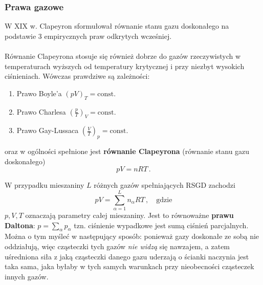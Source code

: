 \documentclass[../main.tex]{subfiles}
\begin{document}
\subsubsection{Prawa gazowe}
W XIX w. Clapeyron sformułował równanie stanu gazu doskonałego na podstawie 3 empirycznych praw
odkrytych wcześniej.\\

\noindent{}\\

Równanie Clapeyrona stosuje się również dobrze do gazów rzeczywistych w temperaturach wyższych od
temperatury krytycznej i przy niezbyt wysokich ciśnieniach. Wówczas prawdziwe są zależności:
\begin{enumerate}
    \item Prawo Boyle'a \((pV)_{T}=\text{const}\).
    \item Prawo Charlesa \(\left(\frac{p}{T}\right)_{V}=\text{const}\).
    \item Prawo Gay-Lussaca \(\left(\frac{V}{T}\right)_{p}=\text{const}\).
\end{enumerate}
oraz w ogólności spełnione jest \textbf{równanie Clapeyrona} (równanie stanu gazu doskonałego)
\begin{equation*}
    pV=nRT\,.
\end{equation*}

W przypadku mieszaniny \(L\) różnych gazów spełniających RSGD zachodzi
\begin{equation*}
    pV=\sum_{\alpha=1}^Ln_\alpha RT\,,\quad\text{gdzie}
\end{equation*}
\(p,V,T\) oznaczają parametry całej mieszaniny. Jest to równoważne \textbf{prawu Daltona}:
\(p=\sum_\alpha p_\alpha\) tzn. ciśnienie wypadkowe jest sumą ciśnień parcjalnych. Można o tym
myśleć w następujący sposób: ponieważ gazy doskonałe ze sobą nie oddziałują, więc cząsteczki tych
gazów \textit{nie widzą} się nawzajem, a zatem uśredniona siła z jaką cząsteczki danego gazu
uderzają o ścianki naczynia jest taka sama, jaka byłaby w tych samych warunkach przy nieobecności
cząsteczek innych gazów.
\end{document}
